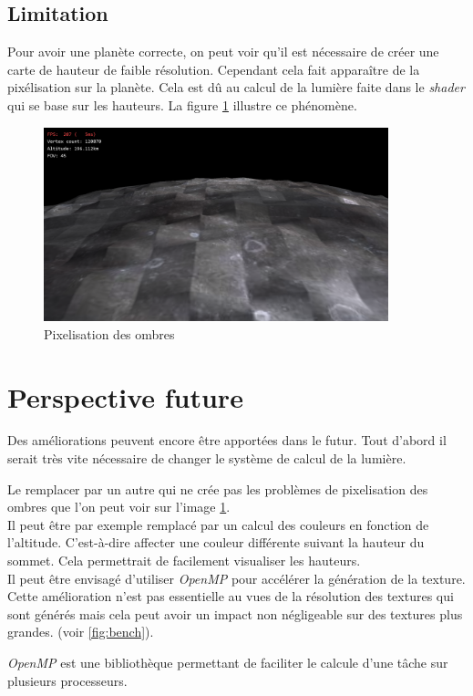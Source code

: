 \subsection{Limitation}

Pour avoir une planète correcte, on peut voir qu'il est nécessaire de créer une carte de hauteur de faible résolution. Cependant cela fait apparaître de la pixélisation sur la planète. Cela est dû au calcul de la lumière faite dans le \textit{shader} qui se base sur les hauteurs. La figure \ref{fig:px_ombre} illustre ce phénomène. \\



\begin{figure}
    \centering
    \includegraphics[width=10cm]{img/SIMPLEX_w200_h200_0.png}
    \caption{Pixelisation des ombres}
    \label{fig:px_ombre}
\end{figure}


\section{Perspective future}

Des améliorations peuvent encore être apportées dans le futur.
Tout d'abord il serait très vite nécessaire de changer le système de calcul de la lumière. 

Le remplacer par un autre qui ne crée pas les problèmes de pixelisation des ombres que l'on peut voir sur l'image \ref{fig:px_ombre}.\\

Il peut être par exemple remplacé par un calcul des couleurs en fonction de l'altitude. C'est-à-dire affecter une couleur différente suivant la hauteur du sommet. Cela permettrait de facilement visualiser les hauteurs.\\

Il peut être envisagé d'utiliser \textit{OpenMP} pour accélérer la génération de la texture. Cette amélioration n'est pas essentielle au vues de la résolution des textures qui sont générés mais cela peut avoir un impact non négligeable sur des textures plus grandes. (voir \ref{fig:bench}).

\textit{OpenMP} est une bibliothèque permettant de faciliter le calcule d'une tâche sur plusieurs processeurs.

